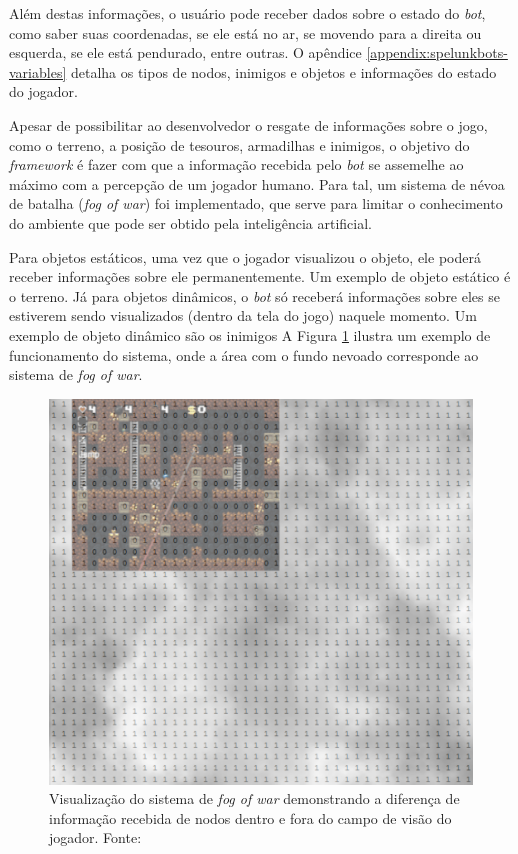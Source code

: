 Além destas informações, o usuário pode receber dados sobre o estado do
\textit{bot}, como saber suas coordenadas, se ele está no ar, se movendo para a
direita ou esquerda, se ele está pendurado, entre outras. O apêndice
\ref{appendix:spelunkbots-variables} detalha os tipos de nodos, inimigos e
objetos e informações do estado do jogador.

Apesar de possibilitar ao desenvolvedor o resgate de informações sobre o jogo,
como o terreno, a posição de tesouros, armadilhas e inimigos, o objetivo do
\textit{framework} é fazer com que a informação recebida pelo \textit{bot} se
assemelhe ao máximo com a percepção de um jogador humano. Para tal, um sistema
de névoa de batalha (\textit{fog of war}) foi implementado, que serve para
limitar o conhecimento do ambiente que pode ser obtido pela inteligência
artificial.

Para objetos estáticos, uma vez que o jogador visualizou o objeto, ele poderá
receber informações sobre ele permanentemente. Um exemplo de objeto estático é o
terreno. Já para objetos dinâmicos, o \textit{bot} só receberá informações sobre
eles se estiverem sendo visualizados (dentro da tela do jogo) naquele momento.
Um exemplo de objeto dinâmico são os inimigos A Figura \ref{fig:spelunkbots-fow}
ilustra um exemplo de funcionamento do sistema, onde a área com o fundo nevoado
corresponde ao sistema de \textit{fog of war}.

\begin{figure}[htb!]
\centering
\includegraphics[width=.60\textwidth]{fig/spelunkbots-fow.pdf}
\caption {Visualização do sistema de \textit{fog of war} demonstrando a
diferença de informação recebida de nodos dentro e fora do campo de visão do
jogador. Fonte: \cite{SPELUNKBOTSPAPER}}
\label{fig:spelunkbots-fow}
\end{figure}

